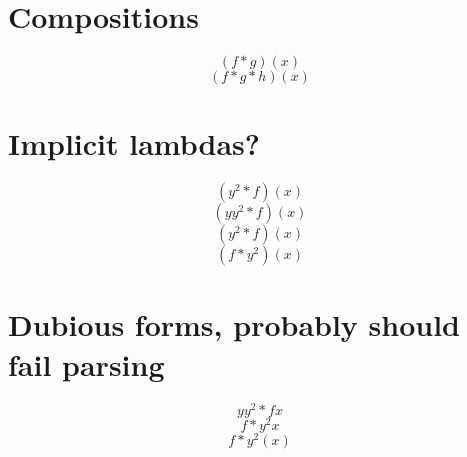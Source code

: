 \documentclass{article}
\begin{document}
\section{Compositions}
\[ (f*g)(x) \]
\[ (f*g*h)(x) \]
\section{Implicit lambdas?}
\[ (y^2 * f)(x) \]
\[ (y y^2 * f)(x) \]
\[ (y^2 * f)(x) \]
\[ (f * y^2)(x) \]
\section{Dubious forms, probably should fail parsing}
\[ y y^2 * f x \]
\[ f * y^2 x \]
\[ f * y^2 (x) \]
\end{document}
